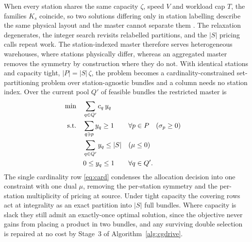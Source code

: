 \documentclass[]{interact}
\begin{document}
When every station shares the same capacity $\zeta$, speed $V$ and workload cap $T$, the families $K_s$ coincide, so two solutions differing only in station labelling describe the same physical layout and the master cannot separate them \citep{vanderbeck2000dw}. The relaxation degenerates, the integer search revisits relabelled partitions, and the $|S|$ pricing calls repeat work. The station-indexed master therefore serves heterogeneous warehouses, where stations physically differ, whereas an aggregated master removes the symmetry by construction where they do not.\label{sec:cgagg} With identical stations and capacity tight, $|P| = |S|\,\zeta$, the problem becomes a cardinality-constrained set-partitioning problem over station-agnostic bundles and a column needs no station index. Over the current pool $Q'$ of feasible bundles the restricted master is
\begin{align}
\min \quad & \sum_{q \in Q'} c_q\, y_q \notag\\
\text{s.t.} \quad
& \sum_{q \ni p} y_q \ge 1 && \forall p \in P \quad (\sigma_p \ge 0) \label{eq:cover}\\
& \sum_{q \in Q'} y_q \le |S| && (\mu \le 0) \label{eq:card}\\
& 0 \le y_q \le 1 && \forall q \in Q'. \notag
\end{align}
The single cardinality row \eqref{eq:card} condenses the allocation decision into one constraint with one dual $\mu$, removing the per-station symmetry and the per-station multiplicity of pricing at source. Under tight capacity the covering rows act at integrality as an exact partition into $|S|$ full bundles. Where capacity is slack they still admit an exactly-once optimal solution, since the objective never gains from placing a product in two bundles, and any surviving double selection is repaired at no cost by Stage~3 of Algorithm~\ref{alg:cgdrive}.
\end{document}
